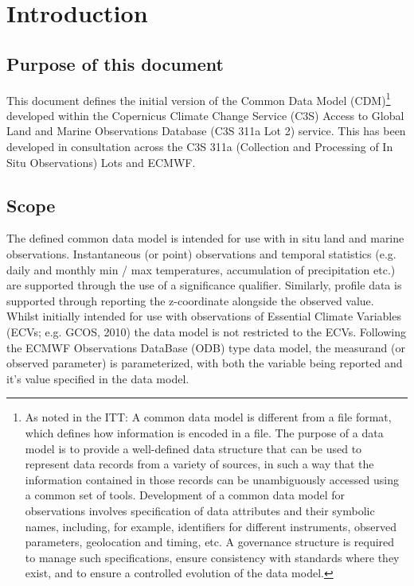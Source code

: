 \documentclass[a4paper,11pt]{article}
\begin{document}
\newpage
\tableofcontents
\newpage
\listoftables
\newpage


\section {Introduction}

\subsection {Purpose of this document}
This document defines the initial version of the Common Data Model (CDM)\footnote{As noted in the ITT: A common data model is different from a file format, which defines how information is encoded in a file. The purpose of a data model is to provide a well-defined data structure that can be used to represent data records from a variety of sources, in such a way that the information contained in those records can be unambiguously accessed using a common set of tools. Development of a common data model for observations involves specification of data attributes and their symbolic names, including, for example, identifiers for different instruments, observed parameters, geolocation and timing, etc. A governance structure is required to manage such specifications, ensure consistency with standards where they exist, and to ensure a controlled evolution of the data model.} developed within the Copernicus Climate Change Service (C3S) Access to Global Land and Marine Observations Database (C3S 311a Lot 2) service. This has been developed in consultation across the C3S 311a (Collection and Processing of In Situ Observations) Lots and ECMWF.

\subsection {Scope}
The defined common data model is intended for use with in situ land and marine observations. Instantaneous (or point) observations and temporal statistics (e.g. daily and monthly min / max temperatures, accumulation of precipitation etc.)  are supported through the use of a significance qualifier. Similarly, profile data is supported through reporting the z-coordinate alongside the observed value.\\

Whilst initially intended for use with observations of Essential Climate Variables (ECVs; e.g. GCOS, 2010) the data model is not restricted to the ECVs. Following the ECMWF Observations DataBase (ODB) type data model, the measurand (or observed parameter) is parameterized, with both the variable being reported and it's value specified in the data model.\\
\end{document}
